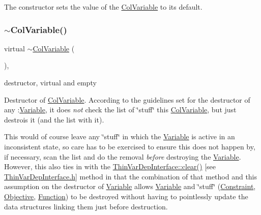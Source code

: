 The constructor sets the value of the \mbox{\hyperlink{class_s_m_spp__di__unipi__it_1_1_col_variable}{Col\+Variable}} to its default. \mbox{\label{class_s_m_spp__di__unipi__it_1_1_col_variable_ae9ca8b45b9aeb665f8c709bba968956a}} 
\subsubsection{\texorpdfstring{$\sim$\+Col\+Variable()}{~ColVariable()}}
{\footnotesize\ttfamily virtual $\sim$\mbox{\hyperlink{class_s_m_spp__di__unipi__it_1_1_col_variable}{Col\+Variable}} (\begin{DoxyParamCaption}{ }\end{DoxyParamCaption})\hspace{0.3cm}{\ttfamily [inline]}, {\ttfamily [virtual]}}



destructor, virtual and empty 

Destructor of \mbox{\hyperlink{class_s_m_spp__di__unipi__it_1_1_col_variable}{Col\+Variable}}. According to the guidelines set for the destructor of any \+:\mbox{\hyperlink{class_s_m_spp__di__unipi__it_1_1_variable}{Variable}}, it does {\itshape not} check the list of \char`\"{}stuff\char`\"{} this \mbox{\hyperlink{class_s_m_spp__di__unipi__it_1_1_col_variable}{Col\+Variable}}, but just destrois it (and the list with it).

This would of course leave any \char`\"{}stuff\char`\"{} in which the \mbox{\hyperlink{class_s_m_spp__di__unipi__it_1_1_variable}{Variable}} is active in an inconsistent state, so care has to be exercised to ensure this does not happen by, if necessary, scan the list and do the removal {\itshape before} destroying the \mbox{\hyperlink{class_s_m_spp__di__unipi__it_1_1_variable}{Variable}}. However, this also ties in with the \mbox{\hyperlink{group___thin_var_dep_interface___c_l_a_s_s_e_s_gae16067de85b435fac4ce8558b193a99a}{Thin\+Var\+Dep\+Interface\+::clear()}} \mbox{[}see \mbox{\hyperlink{_thin_var_dep_interface_8h}{Thin\+Var\+Dep\+Interface.\+h}}\mbox{]} method in that the combination of that method and this assumption on the destructor of \mbox{\hyperlink{class_s_m_spp__di__unipi__it_1_1_variable}{Variable}} allows \mbox{\hyperlink{class_s_m_spp__di__unipi__it_1_1_variable}{Variable}} and \char`\"{}stuff\char`\"{} (\mbox{\hyperlink{class_s_m_spp__di__unipi__it_1_1_constraint}{Constraint}}, \mbox{\hyperlink{class_s_m_spp__di__unipi__it_1_1_objective}{Objective}}, \mbox{\hyperlink{class_s_m_spp__di__unipi__it_1_1_function}{Function}}) to be destroyed without having to pointlessly update the data structures linking them just before destruction. 

